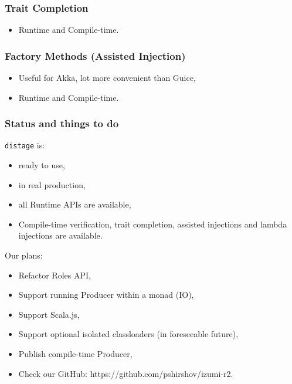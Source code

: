 \documentclass[usenames,dvipsnames]{beamer}
\newcommand{\distage}{\texttt{distage}\xspace}
\begin{document}
\begin{frame}
\frametitle{Trait Completion}
\begin{itemize}
\item Runtime and Compile-time.
\end{itemize}
\end{frame}

\begin{frame}
\frametitle{Factory Methods (Assisted Injection)}
\begin{itemize}
\item Useful for Akka, lot more convenient than Guice,
\item Runtime and Compile-time.
\end{itemize}
\end{frame}

\begin{frame}
\frametitle{Status and things to do}
\distage is:
\begin{itemize}
\item ready to use,
\item in real production,
\item all Runtime APIs are available,
\item Compile-time verification, trait completion, assisted injections and lambda injections are available.
\end{itemize}
\vspace{0.3cm}
Our plans:
\begin{itemize}
\item Refactor Roles API,
\item Support running Producer within a monad (IO),
\item Support Scala.js,
\item Support optional isolated classloaders (in foreseeable future),
\item Publish compile-time Producer,
\item Check our GitHub: https://github.com/pshirshov/izumi-r2.
\end{itemize}
\end{frame}
\end{document}
